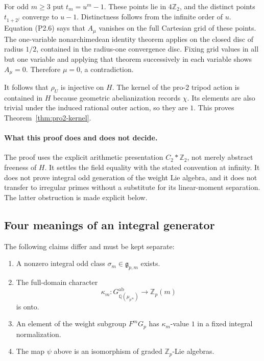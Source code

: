\documentclass[11pt,a4paper]{article}
\theoremstyle{definition}
\begin{document}
For odd $m\geq3$ put $t_m=u^m-1$. These points lie in $4\mathbb Z_2$, and the distinct points $t_{1+2^j}$ converge to $u-1$. Distinctness follows from the infinite order of $u$. Equation (P2.6) says that $A_\mu$ vanishes on the full Cartesian grid of these points. The one-variable nonarchimedean identity theorem applies on the closed disc of radius $1/2$, contained in the radius-one convergence disc. Fixing grid values in all but one variable and applying that theorem successively in each variable shows $A_\mu=0$. Therefore $\mu=0$, a contradiction.

It follows that $\rho_U$ is injective on $H$. The kernel of the pro-$2$ tripod action is contained in $H$ because geometric abelianization records $\chi$. Its elements are also trivial under the induced rational outer action, so they are $1$. This proves Theorem~\ref{thm:pro2-kernel}.

\paragraph{What this proof does and does not decide.}
The proof uses the explicit arithmetic presentation $C_2*\mathbb Z_2$, not merely abstract freeness of $H$. It settles the field equality with the stated convention at infinity. It does not prove integral odd generation of the weight Lie algebra, and it does not transfer to irregular primes without a substitute for its linear-moment separation. The latter obstruction is made explicit below.


\subsection{Four meanings of an integral generator}
\label{sec:four-integral-meanings}

The following claims differ and must be kept separate:
\begin{enumerate}
\item[(A)] A nonzero integral odd class $\sigma_m\in\mathfrak g_{p,m}$ exists.
\item[(B)] The full-domain character
\[
 \kappa_m:G_{\mathbb Q(\mu_{p^\infty})}^{\mathrm{ab}}
       \longrightarrow\mathbb Z_p(m)
\]
is onto.
\item[(C)] An element of the weight subgroup $F^mG_p$ has $\kappa_m$-value $1$ in a fixed integral normalization.
\item[(D)] The map $\psi$ above is an isomorphism of graded $\mathbb Z_p$-Lie algebras.
\end{enumerate}
\end{document}

